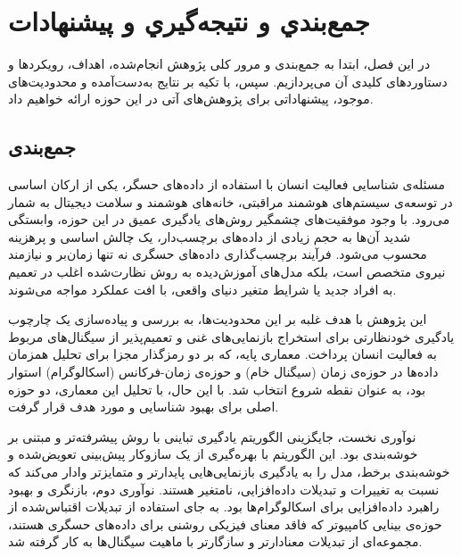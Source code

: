 \chapter{جمع‌بندي و نتيجه‌گيري و پیشنهادات}
\clearpage
در این فصل، ابتدا به جمع‌بندی و مرور کلی پژوهش انجام‌شده، اهداف، رویکردها و دستاوردهای کلیدی آن می‌پردازیم. سپس، با تکیه بر نتایج به‌دست‌آمده و محدودیت‌های موجود، پیشنهاداتی برای پژوهش‌های آتی در این حوزه ارائه خواهیم داد.

\section{جمع‌بندی}

مسئله‌ی شناسایی فعالیت انسان با استفاده از داده‌های حسگر، یکی از ارکان اساسی در توسعه‌ی سیستم‌های هوشمند مراقبتی، خانه‌های هوشمند و سلامت دیجیتال به شمار می‌رود. با وجود موفقیت‌های چشمگیر روش‌های یادگیری عمیق در این حوزه، وابستگی شدید آن‌ها به حجم زیادی از داده‌های برچسب‌دار، یک چالش اساسی و پرهزینه محسوب می‌شود. فرآیند برچسب‌گذاری داده‌های حسگری نه تنها زمان‌بر و نیازمند نیروی متخصص است، بلکه مدل‌های آموزش‌دیده به روش نظارت‌شده اغلب در تعمیم به افراد جدید یا شرایط متغیر دنیای واقعی، با افت عملکرد مواجه می‌شوند.

این پژوهش با هدف غلبه بر این محدودیت‌ها، به بررسی و پیاده‌سازی یک چارچوب یادگیری خودنظارتی برای استخراج بازنمایی‌های غنی و تعمیم‌پذیر از سیگنال‌های مربوط به فعالیت انسان پرداخت. معماری پایه، که بر دو رمزگذار مجزا برای تحلیل همزمان داده‌ها در حوزه‌ی زمان (سیگنال خام) و حوزه‌ی زمان-فرکانس (اسکالوگرام) استوار بود، به عنوان نقطه شروع انتخاب شد. با این حال، با تحلیل این معماری، دو حوزه اصلی برای بهبود شناسایی و مورد هدف قرار گرفت.

نوآوری نخست، جایگزینی الگوریتم یادگیری تباینی  با روش پیشرفته‌تر و مبتنی بر خوشه‌بندی  بود. این الگوریتم با بهره‌گیری از یک سازوکار پیش‌بینی تعویض‌شده و خوشه‌بندی برخط، مدل را به یادگیری بازنمایی‌هایی پایدارتر و متمایزتر وادار می‌کند که نسبت به تغییرات و تبدیلات داده‌افزایی، نامتغیر هستند. نوآوری دوم، بازنگری و بهبود راهبرد داده‌افزایی برای اسکالوگرام‌ها بود. به جای استفاده از تبدیلات اقتباس‌شده از حوزه‌ی بینایی کامپیوتر که فاقد معنای فیزیکی روشنی برای داده‌های حسگری هستند، مجموعه‌ای از تبدیلات معنادارتر و سازگارتر با ماهیت سیگنال‌ها به کار گرفته شد.

